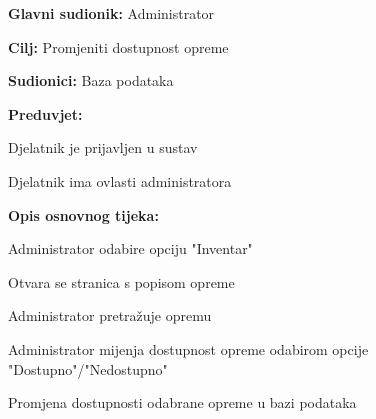 				
				\noindent {}
				\begin{packed_item}
					
					\item \textbf{Glavni sudionik: }Administrator
					\item  \textbf{Cilj: }Promjeniti dostupnost opreme
					\item  \textbf{Sudionici: }Baza podataka
					\item  \textbf{Preduvjet: }
					\item[] \begin{packed_enum}
						
						\item[-] Djelatnik je prijavljen u sustav
						\item[-] Djelatnik ima ovlasti administratora
					\end{packed_enum}
					\item  \textbf{Opis osnovnog tijeka: }
					
					\item[] \begin{packed_enum}
						\item Administrator odabire opciju "Inventar"
						\item Otvara se stranica s popisom opreme
						\item Administrator pretražuje opremu
						\item Administrator mijenja dostupnost opreme odabirom opcije "Dostupno"/"Nedostupno"
						\item Promjena dostupnosti odabrane opreme u bazi podataka
					\end{packed_enum}
					
				\end{packed_item}
				
